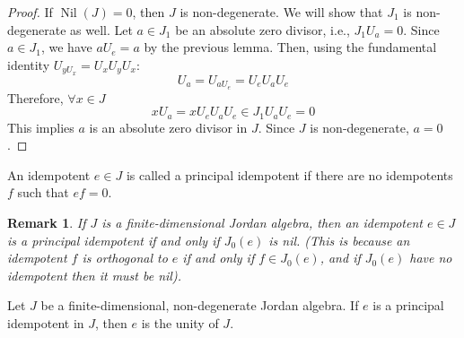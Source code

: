 \documentclass{article}
\newtheorem{remark}[theorem]{Remark}
\begin{document}
\begin{proof}  
If $\operatorname{Nil}(J)=0$, then $J$ is non-degenerate. We will show that $J_1$ is non-degenerate as well.  
Let $a \in J_1$ be an absolute zero divisor, i.e., $J_1U_a=0$.  
Since $a \in J_1$, we have $aU_e=a$ by the previous lemma. Then, using the fundamental identity $U_{yU_x} = U_x U_y U_x$:  
\[ U_a = U_{aU_e} = U_e U_a U_e \]  
Therefore, $ \forall x \in J $   
\[
    xU_a = xU_e U_a U_e\in J_1 U_a U_e =0 
 \]
This implies $a$ is an absolute zero divisor in $J$. Since $J$ is non-degenerate, $a=0$.  
\end{proof} 

\begin{definition} 
An idempotent $e \in J$ is called a principal idempotent if there are no idempotents $f$ such that $ef=0$.  
\end{definition}  

\begin{remark}  
If $J$ is a finite-dimensional Jordan algebra, then an idempotent $e \in J$ is a principal idempotent if and only if $J_0(e)$ is nil.  
(This is because an idempotent $f$ is orthogonal to $e$ if and only if $f \in J_0(e)$, and if $ J_0(e) $ have no idempotent then it must be nil).  
\end{remark}  

\begin{lemma}  
Let $J$ be a finite-dimensional, non-degenerate Jordan algebra. If $e$ is a principal idempotent in $J$, then $e$ is the unity of $J$.  
\end{lemma}  
\end{document}
